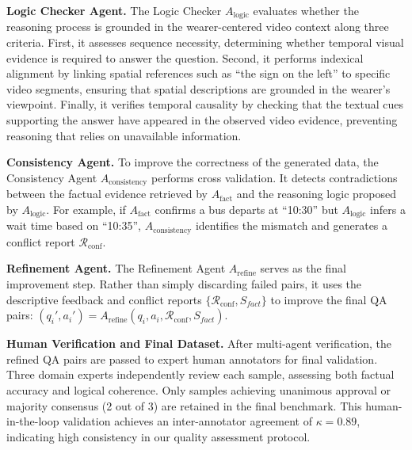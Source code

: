 \noindent\textbf{Logic Checker Agent.}
The Logic Checker $A_{\text{logic}}$ evaluates whether the reasoning process is grounded in the wearer-centered video context along three criteria.
First, it assesses sequence necessity, determining whether temporal visual evidence is required to answer the question.
Second, it performs indexical alignment by linking spatial references such as ``the sign on the left'' to specific video segments, ensuring that spatial descriptions are grounded in the wearer's viewpoint.
Finally, it verifies temporal causality by checking that the textual cues supporting the answer have appeared in the observed video evidence, preventing reasoning that relies on unavailable information.

\noindent\textbf{Consistency Agent.}
To improve the correctness of the generated data, the {Consistency Agent} $A_{\text{consistency}}$ performs cross validation. It detects contradictions between the factual evidence retrieved by $A_{\text{fact}}$ and the reasoning logic proposed by $A_{\text{logic}}$. For example, if $A_{\text{fact}}$ confirms a bus departs at ``10:30'' but $A_{\text{logic}}$ infers a wait time based on ``10:35'', $A_{\text{consistency}}$ identifies the mismatch and generates a conflict report $\mathcal{R}_{\text{conf}}$.

\noindent\textbf{Refinement Agent.}
The {Refinement Agent} $A_{\text{refine}}$ serves as the final improvement step. Rather than simply discarding failed pairs, it uses the descriptive feedback and conflict reports $\{\mathcal{R}_{\text{conf}}, S_{fact}\}$ to improve the final QA pairs: $(q_i', a_i') = A_{\text{refine}}(q_i, a_i, \mathcal{R}_{\text{conf}}, S_{fact})$.


\noindent\textbf{Human Verification and Final Dataset.}
After multi-agent verification, the refined QA pairs are passed to expert human annotators for final validation. Three domain experts independently review each sample, assessing both factual accuracy and logical coherence. Only samples achieving unanimous approval or majority consensus (2 out of 3) are retained in the final benchmark. This human-in-the-loop validation achieves an inter-annotator agreement of $\kappa = 0.89$, indicating high consistency in our quality assessment protocol.


